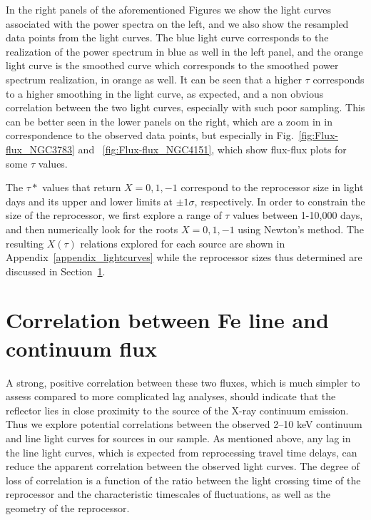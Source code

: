     In the right panels of the aforementioned Figures we show the light curves associated with the power spectra on the left, and we also show the resampled data points from the light curves. The blue light curve corresponds to the realization of the power spectrum in blue as well in the left panel, and the orange light curve is the smoothed curve which corresponds to the smoothed power spectrum realization, in orange as well. It can be seen that a higher $\tau$ corresponds to a higher smoothing in the light curve, as expected, and a non obvious correlation between the two light curves, especially with such poor sampling. This can be better seen in the lower panels on the right, which are a zoom in in correspondence to the observed data points, but especially in Fig.~\ref{fig:Flux-flux_NGC3783} and ~\ref{fig:Flux-flux_NGC4151}, which show flux-flux plots for some $\tau$ values. 
 
The $\tau*$ values that return $X=0,1,-1$ correspond to the reprocessor size in light days and its upper and lower limits at $\pm1\sigma$, respectively. In order to constrain the size of the reprocessor, we first explore a range of $\tau$ values between 1-10,000 days, and then numerically look for the roots $X=0,1,-1$ using Newton's method. The resulting $X(\tau)$ relations explored for each source are shown in Appendix~\ref{appendix_lightcurves} while the reprocessor sizes thus determined are discussed in Section~\ref{sec:lc_results}.

\section{Correlation between Fe line and continuum flux} \label{sec:lc_results}

A strong, positive correlation between these two fluxes, which is much simpler to assess compared to more complicated lag analyses, should indicate that the reflector lies in close proximity to the source of the X-ray continuum emission. 
Thus we explore potential correlations between the observed 2--10 keV continuum and \kalfa{} %
line light curves for sources in our sample. As mentioned above, any lag in the \kalfa{} line light curves, which is expected from reprocessing travel time delays, can reduce the apparent correlation between the observed light curves. The degree of loss of correlation is a function of the ratio between the light crossing time of the reprocessor and the characteristic timescales of fluctuations, as well as the geometry of the reprocessor. 

